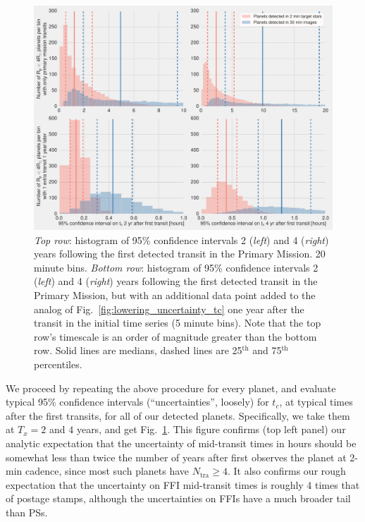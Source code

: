 \begin{figure}[!t]
	\centering
	\includegraphics[scale=1.]{figures/confidence_interval_gets_better.pdf}
	\caption{\textit{Top row}: histogram of 95\% confidence intervals 2 (\textit{left}) and 4 (\textit{right}) years following the first detected transit in the Primary Mission.
		20 minute bins.
		\textit{Bottom row}: histogram of 95\% confidence intervals 2 (\textit{left}) and 4 (\textit{right}) years following the first detected transit in the Primary Mission, but with an additional data point added to the analog of Fig.~\protect\ref{fig:lowering_uncertainty_tc} one year after the transit in the initial time series (5 minute bins).
		Note that the top row's timescale is an order of magnitude greater than the bottom row.
		Solid lines are medians, dashed lines are 25$^\mathrm{th}$ and 75$^\mathrm{th}$ percentiles.
	} %
	\label{fig:conf_interval_gets_better}
\end{figure}
We proceed by repeating the above procedure for every planet, and evaluate typical 95\% confidence intervals (``uncertainties'', loosely) for $t_c$, at typical times after the first transits, for all of our detected planets.
Specifically, we take them at $T_x=2$ and $4$ years, and get Fig.~\ref{fig:conf_interval_gets_better}.
This figure confirms (top left panel) our analytic expectation that the uncertainty of mid-transit times in hours should be somewhat less than twice the number of years after \tess first observes the planet at 2-min cadence, since most such planets have $N_\mathrm{tra}\geq4$.
It also confirms our rough expectation that the uncertainty on FFI mid-transit 
times is roughly 4 times that of postage stamps, although the uncertainties on 
FFIs have a much broader tail than PSs.

